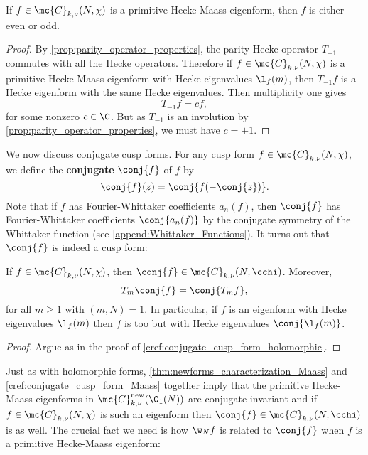     \begin{proposition}\label{prop:Hecke_Maass_eigenform_even_or_odd}
      If $f \in \mc{C}_{k,\nu}(N,\chi)$ is a primitive Hecke-Maass eigenform, then $f$ is either even or odd.
    \end{proposition}
    \begin{proof}
      By \cref{prop:parity_operator_properties}, the parity Hecke operator $T_{-1}$ commutes with all the Hecke operators. Therefore if $f \in \mc{C}_{k,\nu}(N,\chi)$ is a primitive Hecke-Maass eigenform with Hecke eigenvalues $\l_{f}(m)$, then $T_{-1}f$ is a Hecke eigenform with the same Hecke eigenvalues. Then multiplicity one gives
      \[
        T_{-1}f = cf,
      \]
      for some nonzero $c \in \C$. But as $T_{-1}$ is an involution by \cref{prop:parity_operator_properties}, we must have $c = \pm 1$.
    \end{proof}
    
    We now discuss conjugate cusp forms. For any cusp form $f \in \mc{C}_{k,\nu}(N,\chi)$, we define the \textbf{conjugate} $\conj{f}$ of $f$ by
    \[
      \conj{f}(z) = \conj{f(-\conj{z})}.
    \]
    Note that if $f$ has Fourier-Whittaker coefficients $a_{n}(f)$, then $\conj{f}$ has Fourier-Whittaker coefficients $\conj{a_{n}(f)}$ by the conjugate symmetry of the Whittaker function (see \cref{append:Whittaker_Functions}). It turns out that $\conj{f}$ is indeed a cusp form:

    \begin{proposition}\label{cref:conjugate_cusp_form_Maass}
      If $f \in \mc{C}_{k,\nu}(N,\chi)$, then $\conj{f} \in \mc{C}_{k,\nu}(N,\cchi)$. Moreover,
      \[
        T_{m}\conj{f} = \conj{T_{m}f},
      \]
      for all $m \ge 1$ with $(m,N) = 1$. In particular, if $f$ is an eigenform with Hecke eigenvalues $\l_{f}(m)$ then $f$ is too but with Hecke eigenvalues $\conj{\l_{f}(m)}$.
    \end{proposition}
    \begin{proof}
      Argue as in the proof of \cref{cref:conjugate_cusp_form_holomorphic}.
    \end{proof}

    Just as with holomorphic forms, \cref{thm:newforms_characterization_Maass} and \cref{cref:conjugate_cusp_form_Maass} together imply that the primitive Hecke-Maass eigenforms in $\mc{C}_{k,\nu}^{\mathrm{new}}(\G_{1}(N))$ are conjugate invariant and if $f \in \mc{C}_{k,\nu}(N,\chi)$ is such an eigenform then $\conj{f} \in \mc{C}_{k,\nu}(N,\cchi)$ is as well. The crucial fact we need is how $\w_{N}f$ is related to $\conj{f}$ when $f$ is a primitive Hecke-Maass eigenform:

